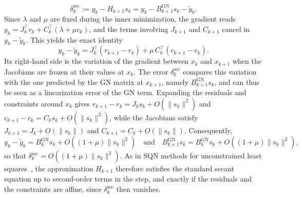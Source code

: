 \documentclass[pdflatex,sn-mathphys-num]{sn-jnl}%
\theoremstyle{thmstyleone}%
\begin{document}
\begin{equation}\label{eq:secant_error}
	\delta^{\mathrm{sec}}_k := y_k - H_{k+1}s_k = y_k - B^{\mathrm{GN}}_{k+1}s_k - \tilde{y}_k.
\end{equation}
Since $\lambda$ and $\mu$ are fixed during the inner minimization, the gradient reads $g_k = J_k^\top r_k + C_k^\top(\lambda + \mu c_k)$, and the terms involving $J_{k+1}$ and $C_{k+1}$ cancel in $y_k - \tilde{y}_k$. This yields the exact identity
\[y_k - \tilde{y}_k = J_k^\top\left(r_{k+1}-r_k\right) + \mu\, C_k^\top\left(c_{k+1}-c_k\right).\]
Its right-hand side is the variation of the gradient between $x_k$ and $x_{k+1}$ when the Jacobians are frozen at their values at $x_k$. The error $\delta^{\mathrm{sec}}_k$ compares this variation with the one predicted by the GN matrix at $x_{k+1}$, namely $B^{\mathrm{GN}}_{k+1}s_k$, and can thus be seen as a linearization error of the GN term. Expanding the residuals and constraints around $x_k$ gives $r_{k+1}-r_k = J_ks_k + O(\|s_k\|^2)$ and $c_{k+1}-c_k = C_ks_k + O(\|s_k\|^2)$, while the Jacobians satisfy $J_{k+1} = J_k + O(\|s_k\|)$ and $C_{k+1} = C_k + O(\|s_k\|)$. Consequently,
\[y_k - \tilde{y}_k = B^{\mathrm{GN}}_ks_k + O\left((1+\mu)\|s_k\|^2\right) \quad \text{and} \quad B^{\mathrm{GN}}_{k+1}s_k = B^{\mathrm{GN}}_ks_k + O\left((1+\mu)\|s_k\|^2\right),\]
so that $\delta^{\mathrm{sec}}_k = O((1+\mu)\|s_k\|^2)$. As in SQN methods for unconstrained least squares~\cite{lucksan-etal:2019}, the approximation $H_{k+1}$ therefore satisfies the standard secant equation up to second-order terms in the step, and exactly if the residuals and the constraints are affine, since $\delta^{\mathrm{sec}}_k$ then vanishes.
\end{document}
